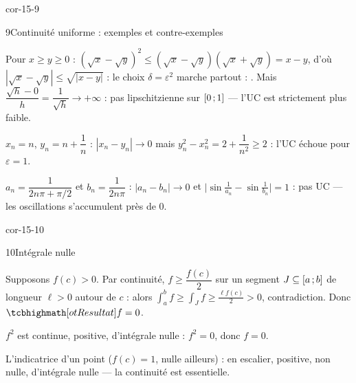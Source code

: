 \begin{blocLivre}{cor-15-9}
\begin{corrige}{9}{Continuité uniforme : exemples et contre-exemples}
\begin{questions}
  \item Pour $x\geqslant y\geqslant0$ :
    $(\sqrt x-\sqrt y)^{2}\leqslant(\sqrt x-\sqrt y)(\sqrt x+\sqrt y)=x-y$,
    d'où $|\sqrt x-\sqrt y|\leqslant\sqrt{|x-y|}$ : le choix
    $\delta=\varepsilon^{2}$ marche partout : . Mais
    $\dfrac{\sqrt h-0}{h}=\dfrac{1}{\sqrt h}\to+\infty$ : pas
    lipschitzienne sur $\mathopen{[}0\,{;}\,1\mathclose{]}$ — l'UC est strictement plus faible.
  \item $x_n=n$, $y_n=n+\dfrac1n$ : $|x_n-y_n|\to0$ mais
    $y_n^{2}-x_n^{2}=2+\dfrac{1}{n^{2}}\geqslant2$ : l'UC échoue pour
    $\varepsilon=1$.
  \item $a_n=\dfrac{1}{2n\pi+\pi/2}$ et $b_n=\dfrac{1}{2n\pi}$ :
    $|a_n-b_n|\to0$ et
    $\bigl|\sin\tfrac{1}{a_n}-\sin\tfrac{1}{b_n}\bigr|=1$ : pas UC —
    les oscillations s'accumulent près de $0$.
\end{questions}
\end{corrige}
\end{blocLivre}

\begin{blocLivre}{cor-15-10}
\begin{corrige}{10}{Intégrale nulle}
\begin{questions}
  \item Supposons $f(c)>0$. Par continuité, $f\geqslant\dfrac{f(c)}{2}$
    sur un segment $J\subseteq\mathopen{[}a\,{;}\,b\mathclose{]}$ de longueur $\ell>0$ autour
    de $c$ : alors
    $\displaystyle\int_{a}^{b}f\geqslant\int_{J}f\geqslant\frac{\ell f(c)}{2}>0$,
    contradiction. Donc $\res{f=0}$.
  \item $f^{2}$ est continue, positive, d'intégrale nulle : $f^{2}=0$,
    donc $f=0$.
  \item L'indicatrice d'un point ($f(c)=1$, nulle ailleurs) : en escalier,
    positive, non nulle, d'intégrale nulle — la continuité est
    essentielle.
\end{questions}
\end{corrige}
\end{blocLivre}

